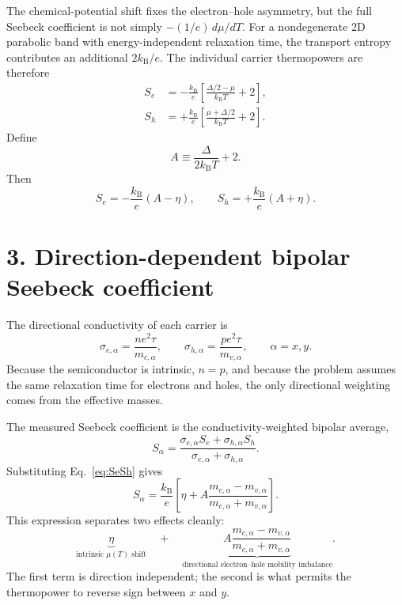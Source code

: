 \documentclass[11pt]{article}
\newcommand{\kb}{k_{\mathrm B}}
\begin{document}
The chemical-potential shift fixes the electron--hole asymmetry, but the full Seebeck coefficient is not simply $-(1/e)\,d\mu/dT$. For a nondegenerate 2D parabolic band with energy-independent relaxation time, the transport entropy contributes an additional $2\kb/e$. The individual carrier thermopowers are therefore
\begin{align}
S_e
&=-\frac{\kb}{e}
\left[
\frac{\Delta/2-\mu}{\kb T}+2
\right],\\
S_h
&=+\frac{\kb}{e}
\left[
\frac{\mu+\Delta/2}{\kb T}+2
\right].
\end{align}
Define
\begin{equation}
A\equiv \frac{\Delta}{2\kb T}+2.
\label{eq:A}
\end{equation}
Then
\begin{equation}
\boxed{
S_e=-\frac{\kb}{e}(A-\eta),
\qquad
S_h=+\frac{\kb}{e}(A+\eta).
}
\label{eq:SeSh}
\end{equation}

\section*{3. Direction-dependent bipolar Seebeck coefficient}

The directional conductivity of each carrier is
\begin{equation}
\sigma_{e,\alpha}=\frac{ne^2\tau}{m_{c,\alpha}},
\qquad
\sigma_{h,\alpha}=\frac{pe^2\tau}{m_{v,\alpha}},
\qquad \alpha=x,y.
\end{equation}
Because the semiconductor is intrinsic, $n=p$, and because the problem assumes the same relaxation time for electrons and holes, the only directional weighting comes from the effective masses.

The measured Seebeck coefficient is the conductivity-weighted bipolar average,
\begin{equation}
S_\alpha=
\frac{\sigma_{e,\alpha}S_e+\sigma_{h,\alpha}S_h}
     {\sigma_{e,\alpha}+\sigma_{h,\alpha}}.
\end{equation}
Substituting Eq.~\eqref{eq:SeSh} gives
\begin{equation}
\boxed{
S_\alpha
=\frac{\kb}{e}
\left[
\eta
+A\frac{m_{c,\alpha}-m_{v,\alpha}}
        {m_{c,\alpha}+m_{v,\alpha}}
\right].
}
\label{eq:Salpha}
\end{equation}
This expression separates two effects cleanly:
\begin{equation}
\underbrace{\eta}_{\text{intrinsic }\mu(T)\text{ shift}}
\quad + \quad
\underbrace{A\frac{m_{c,\alpha}-m_{v,\alpha}}
                   {m_{c,\alpha}+m_{v,\alpha}}}_{\text{directional electron--hole mobility imbalance}}.
\end{equation}
The first term is direction independent; the second is what permits the thermopower to reverse sign between $x$ and $y$.
\end{document}
